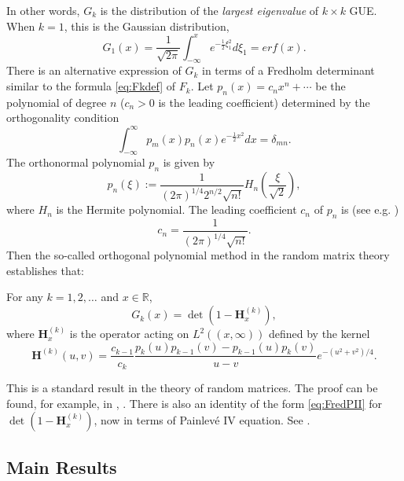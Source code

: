 \documentclass[11pt]{article}
\begin{document}
In other words, $G_k$ is the distribution of the \emph{largest
eigenvalue} of $k\times k$ GUE. When $k=1$, this is the Gaussian
distribution,
\begin{equation}
  G_1(x) = \frac1{\sqrt{2\pi}} \int_{-\infty}^x
  e^{-\frac12 \xi_1^2} d\xi_1
  = erf(x) .
\end{equation}
There is an alternative expression of $G_k$ in terms of a Fredholm
determinant similar to the formula \eqref{eq:Fkdef} of $F_k$. Let
$p_n(x)=c_nx^n+\cdots$ be the polynomial of degree $n$ ($c_n> 0$
is the leading coefficient) determined by the orthogonality
condition
\begin{equation}
  \int_{-\infty}^\infty p_m(x)p_n(x) e^{-\frac12 x^2} dx =
  \delta_{mn}.
\end{equation}
The orthonormal polynomial $p_n$ is given by
\begin{equation}\label{eq:porthonomal}
  p_n(\xi):= \frac1{(2\pi)^{1/4}2^{n/2}\sqrt{n!}}
  H_n(\frac{\xi}{\sqrt{2}}),
\end{equation}
where $H_n$ is the Hermite polynomial. The leading coefficient
$c_n$ of $p_n$ is (see e.g. \cite{Koekoek})
\begin{equation}
  c_n= \frac{1}{(2\pi)^{1/4}\sqrt{n!}} .
\end{equation}
Then the so-called orthogonal polynomial method in the random
matrix theory establishes that:
\begin{lemma}
For any $k=1,2,\dots$ and $x\in\mathbb{R}$,
\begin{equation}\label{eq:Hop}
  G_k(x) = \det(1-\mathbf{H}_x^{(k)}),
\end{equation}
where $\mathbf{H}^{(k)}_x$ is the operator acting on
$L^2((x,\infty))$ defined by the kernel
\begin{equation}
  \mathbf{H}^{(k)}(u,v) = \frac{c_{k-1}}{c_{k}}
  \frac{p_k(u)p_{k-1}(v)-p_{k-1}(u)p_k(v)}{u-v} e^{-(u^2+v^2)/4}.
\end{equation}
\end{lemma}

This is a standard result in the theory of random matrices. The
proof can be found, for example, in \cite{Mehta}, \cite{TW2}.
There is also an identity of the form \eqref{eq:FredPII} for
$\det(1-\mathbf{H}_x^{(k)})$, now in terms of Painlev\'e IV
equation. See \cite{TracyWidomFred}.

\subsection{Main Results}\label{sec:mainresults}
\end{document}
